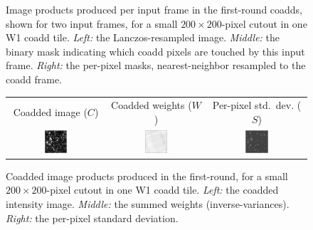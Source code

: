 \documentclass[11pt,preprint]{aastex}
\newcommand{\fimg}[1]{#1}
\newcommand{\coadd}{\fimg{C}}
\newcommand{\cowt}{\fimg{W}}
\newcommand{\copp}{\fimg{S}}
\begin{document}
\begin{figure}
\begin{center}
\begin{tabular}{@{}ccc@{}}
\end{tabular}
\end{center}
\caption{Image products produced per input frame in the first-round
  coadds, shown for two input frames, for a small
  $200\times200$-pixel cutout in one W1 coadd tile.  \emph{Left:} the
  Lanczos-resampled image.  \emph{Middle:} the binary mask indicating
  which coadd pixels are touched by this input frame.  \emph{Right:}
  the per-pixel masks, nearest-neighbor resampled to the coadd frame.
\label{fig:round1}}
\end{figure}


\begin{figure}
\begin{center}
\begin{tabular}{@{}ccc@{}}
Coadded image ($\coadd$) &
Coadded weights ($\cowt$) &
Per-pixel std.~dev. ($\copp$) \\
\includegraphics[width=0.25\textwidth]{plots1/sequels-024} &
\includegraphics[width=0.25\textwidth]{plots1/sequels-025} &
\includegraphics[width=0.25\textwidth]{plots1/sequels-026}
\end{tabular}
\end{center}
\caption{Coadded image products produced in the first-round, for a
  small $200\times200$-pixel cutout in one W1 coadd tile.  \emph{Left:}
  the coadded intensity image.  \emph{Middle:} the summed weights
  (inverse-variances).  \emph{Right:} the per-pixel standard deviation.
  \label{fig:round1co}}
\end{figure}
\end{document}
